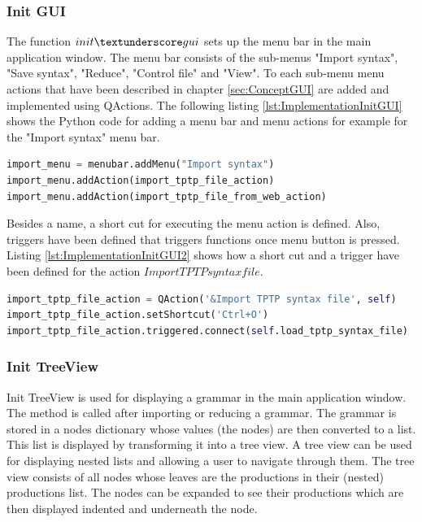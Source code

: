 \subsubsection{Init GUI}\label{sec:ImplementationGUIInit}

The function $init\textunderscore gui$ sets up the menu bar in the main application window. The menu bar consists of the sub-menus "Import syntax", "Save syntax", "Reduce", "Control file" and "View". To each sub-menu menu actions that have been described in chapter \ref{sec:ConceptGUI} are added and implemented using QActions. The following listing \ref{lst:ImplementationInitGUI} shows the Python code for adding a menu bar and menu actions for example for the "Import syntax" menu bar.

\begin{lstlisting}[language=Python, basicstyle=\scriptsize	,caption= Implementation of menu bar,label= lst:ImplementationInitGUI]
import_menu = menubar.addMenu("Import syntax")
import_menu.addAction(import_tptp_file_action)
import_menu.addAction(import_tptp_file_from_web_action)
\end{lstlisting}

Besides a name, a short cut for executing the menu action is defined. Also, triggers have been defined that triggers functions once menu button is pressed. Listing \ref{lst:ImplementationInitGUI2} shows how a short cut and a trigger have been defined for the action $Import TPTP syntax file$.

\begin{lstlisting}[language=Python, basicstyle=\scriptsize	,caption= Implementation of menu actions,label= lst:ImplementationInitGUI2]
import_tptp_file_action = QAction('&Import TPTP syntax file', self)
import_tptp_file_action.setShortcut('Ctrl+O')
import_tptp_file_action.triggered.connect(self.load_tptp_syntax_file)
\end{lstlisting}


\subsubsection{Init TreeView}\label{sec:ImplementationGUIInitTreeView}
Init TreeView is used for displaying a grammar in the main application window. The method is called after importing or reducing a grammar. The grammar is stored in a nodes dictionary whose values (the nodes) are then converted to a list. This list is displayed by transforming it into a tree view. A tree view can be used for displaying nested lists and allowing a user to navigate through them. The tree view consists of all nodes whose leaves are the productions in their (nested) productions list. The nodes can be expanded to see their productions which are then displayed indented and underneath the node.

